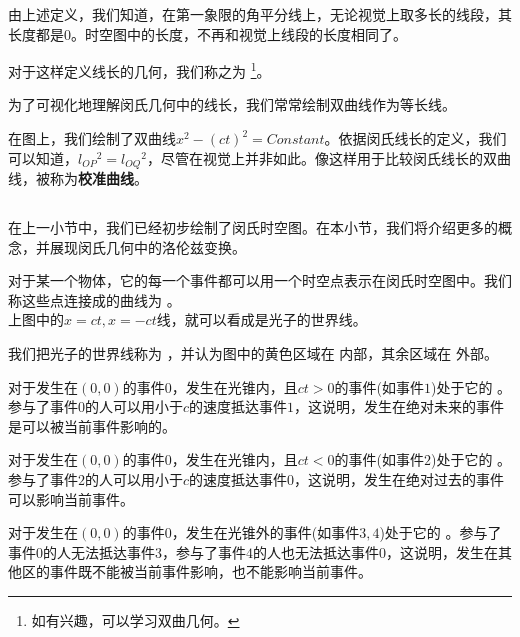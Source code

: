 由上述定义，我们知道，在第一象限的角平分线上，无论视觉上取多长的线段，其长度都是$0$。时空图中的长度，不再和视觉上线段的长度相同了。

对于这样定义线长的几何，我们称之为 \footnote{如有兴趣，可以学习双曲几何。}。

为了可视化地理解闵氏几何中的线长，我们常常绘制双曲线作为等长线。

在图上，我们绘制了双曲线$x^2-(ct)^2=Constant$。依据闵氏线长的定义，我们可以知道，$l_{OP}{}^2=l_{OQ}{}^2$，尽管在视觉上并非如此。像这样用于比较闵氏线长的双曲线，被称为\textbf{校准曲线}。
\subsection[闵氏几何中的洛伦兹变换]{}
在上一小节中，我们已经初步绘制了闵氏时空图。在本小节，我们将介绍更多的概念，并展现闵氏几何中的洛伦兹变换。

\begin{Itemize}
	\item {} 对于某一个物体，它的每一个事件都可以用一个时空点表示在闵氏时空图中。我们称这些点连接成的曲线为 。\\
	\eg 上图中的$x=ct,x=-ct$线，就可以看成是光子的世界线。
	\item {} 我们把光子的世界线称为 ，并认为图中的黄色区域在  内部，其余区域在  外部。
	\item {} 对于发生在$(0,0)$的事件$0$，发生在光锥内，且$ct>0$的事件(如事件$1$)处于它的 。参与了事件$0$的人可以用小于$c$的速度抵达事件$1$，这说明，发生在绝对未来的事件是可以被当前事件影响的。
	\item {} 对于发生在$(0,0)$的事件$0$，发生在光锥内，且$ct<0$的事件(如事件$2$)处于它的 。参与了事件$2$的人可以用小于$c$的速度抵达事件$0$，这说明，发生在绝对过去的事件可以影响当前事件。
	\item {} 对于发生在$(0,0)$的事件$0$，发生在光锥外的事件(如事件$3,4$)处于它的 。参与了事件$0$的人无法抵达事件$3$，参与了事件$4$的人也无法抵达事件$0$，这说明，发生在其他区的事件既不能被当前事件影响，也不能影响当前事件。
\end{Itemize}

